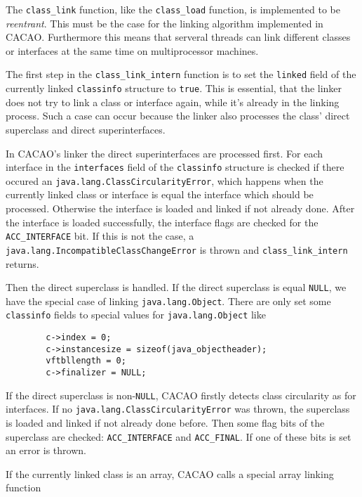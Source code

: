 The \texttt{class\_link} function, like the \texttt{class\_load}
function, is implemented to be \textit{reentrant}. This must be the
case for the linking algorithm implemented in CACAO. Furthermore this
means that serveral threads can link different classes or interfaces
at the same time on multiprocessor machines.

The first step in the \texttt{class\_link\_intern} function is to set
the \texttt{linked} field of the currently linked \texttt{classinfo}
structure to \texttt{true}. This is essential, that the linker does
not try to link a class or interface again, while it's already in the
linking process. Such a case can occur because the linker also
processes the class' direct superclass and direct superinterfaces.

In CACAO's linker the direct superinterfaces are processed first. For
each interface in the \texttt{interfaces} field of the
\texttt{classinfo} structure is checked if there occured an
\texttt{java.lang.ClassCircularityError}, which happens when the
currently linked class or interface is equal the interface which
should be processed. Otherwise the interface is loaded and linked if
not already done. After the interface is loaded successfully, the
interface flags are checked for the \texttt{ACC\_INTERFACE} bit. If
this is not the case, a
\texttt{java.lang.IncompatibleClassChangeError} is thrown and
\texttt{class\_link\_intern} returns.

Then the direct superclass is handled. If the direct superclass is
equal \texttt{NULL}, we have the special case of linking
\texttt{java.lang.Object}. There are only set some \texttt{classinfo}
fields to special values for \texttt{java.lang.Object} like

\begin{verbatim}
        c->index = 0;
        c->instancesize = sizeof(java_objectheader);
        vftbllength = 0;
        c->finalizer = NULL;
\end{verbatim}

If the direct superclass is non-\texttt{NULL}, CACAO firstly detects
class circularity as for interfaces. If no
\texttt{java.lang.ClassCircularityError} was thrown, the superclass is
loaded and linked if not already done before. Then some flag bits of
the superclass are checked: \texttt{ACC\_INTERFACE} and
\texttt{ACC\_FINAL}. If one of these bits is set an error is thrown.

If the currently linked class is an array, CACAO calls a special array
linking function

